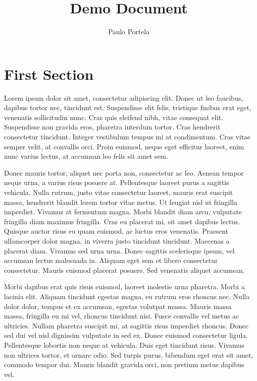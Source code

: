 \documentclass{article}
\begin{document}
	\title{Demo Document}  %
	\author{Paulo Portela}  %
	\maketitle  %
	\newpage
	
	\tableofcontents
	\newpage
	
	\section{First Section}
	
	Lorem ipsum dolor sit amet, consectetur adipiscing elit. Donec ut leo faucibus, dapibus tortor nec, tincidunt est. Suspendisse elit felis, tristique finibus erat eget, venenatis sollicitudin nunc. Cras quis eleifend nibh, vitae consequat elit. Suspendisse non gravida eros, pharetra interdum tortor. Cras hendrerit consectetur tincidunt. Integer vestibulum tempus mi at condimentum. Cras vitae semper velit, at convallis orci. Proin euismod, neque eget efficitur laoreet, enim nunc varius lectus, at accumsan leo felis sit amet sem.
	
	Donec mauris tortor, aliquet nec porta non, consectetur ac leo. Aenean tempor neque urna, a varius risus posuere at. Pellentesque laoreet purus a sagittis vehicula. Nulla rutrum, justo vitae consectetur laoreet, mauris erat suscipit massa, hendrerit blandit lorem tortor vitae metus. Ut feugiat nisl ut fringilla imperdiet. Vivamus at fermentum magna. Morbi blandit diam arcu, vulputate fringilla diam maximus fringilla. Cras eu placerat mi, sit amet dapibus lectus. Quisque auctor risus eu quam euismod, ac luctus eros venenatis. Praesent ullamcorper dolor magna, in viverra justo tincidunt tincidunt. Maecenas a placerat diam. Vivamus sed urna urna. Donec sagittis scelerisque ipsum, vel accumsan lectus malesuada in. Aliquam eget sem et libero consectetur consectetur. Mauris euismod placerat posuere. Sed venenatis aliquet accumsan.
	
	Morbi dapibus erat quis risus euismod, laoreet molestie urna pharetra. Morbi a lacinia elit. Aliquam tincidunt egestas magna, eu rutrum eros rhoncus nec. Nulla dolor dolor, tempus et ex accumsan, egestas volutpat massa. Mauris massa massa, fringilla eu mi vel, rhoncus tincidunt nisi. Fusce convallis vel metus ac ultricies. Nullam pharetra suscipit mi, at sagittis risus imperdiet rhoncus. Donec sed dui vel nisl dignissim vulputate in sed ex. Donec euismod consectetur ligula. Pellentesque lobortis non neque at vehicula. Duis eget tincidunt risus. Vivamus non ultrices tortor, et ornare odio. Sed turpis purus, bibendum eget erat sit amet, commodo tempor dui. Mauris blandit gravida orci, non pretium metus dapibus vel.
\end{document}
